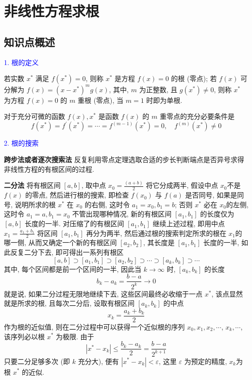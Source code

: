 \newpage

\section{非线性方程求根}
\subsection{知识点概述}

\textcolor{blue}{1. 根的定义}

若实数 $ x^{*} $ 满足 $ f\left(x^{*}\right)=0 $, 则称 $ x^{*} $ 是方程 $ f(x)=0 $ 的根 (零点); 若 $ f(x) $ 可分解为 $ f(x)=\left(x-x^{*}\right)^{m} g(x) $, 其中, $ m $ 为正整数, 且 $ g\left(x^{*}\right) \neq 0 $, 则称 $ x^{*} $ 为方程 $ f(x)=0 $ 的 $ m $ 重根 (零点), 当 $ m=1 $ 时即为单根.

对于充分可微的函数 $ f(x), x^{*} $ 是函数 $ f(x) $ 的 $ m $ 重零点的充分必要条件是
$$
f\left(x^{*}\right)=f^{\prime}\left(x^{*}\right)=\cdots=f^{(m-1)}\left(x^{*}\right)=0, \quad f^{(m)}\left(x^{*}\right) \neq 0
$$

\textcolor{blue}{2. 根的搜索}

\textbf{跨步法或者逐次搜索法} \; 反复利用零点定理选取合适的步长判断端点是否异号求得非线性方程的有根区间的过程.

\textbf{二分法} \; 将有根区间 $ [a, b] $, 取中点 $ x_{0}=\frac{(a+b)}{2} $ 将它分成两半, 假设中点 $ x_{0} $不是 $ f(x) $ 的零点, 然后进行根的搜索, 即检查 $ f\left(x_{0}\right) $ 与 $ f(a) $ 是否同号, 如果是同号, 说明所求的根 $ x^{*} $ 在 $ x_{0} $ 的右侧, 这时令 $ a_{1}=x_{0}, b_{1}=b $; 否则 $ x^{*} $ 必在 $ x_{0} $的左侧, 这时令 $ a_{1}=a, b_{1}=x_{0} $ 不管出现哪种情况, 新的有根区间 $ \left[a_{1}, b_{1}\right] $ 的长度仅为 $ [a, b] $ 长度的一半. 对压缩了的有根区间 $ \left[a_{1}, b_{1}\right] $ 继续上述过程, 即用中点 $ x_{1}=\frac{a_{1}+b_{1}}{2} $ 将区间 $ \left[a_{1}, b_{1}\right] $ 再分为两半, 然后通过根的搜索判定所求的根在 $ x_{1} $的哪一侧, 从而又确定一个新的有根区间 $ \left[a_{2}, b_{2}\right] $, 其长度是 $ \left[a_{1}, b_{1}\right] $ 长度的一半, 如此反复二分下去, 即可得出一系列有根区
$$
[a, b] \supset\left[a_{1}, b_{1}\right] \supset\left[a_{2}, b_{2}\right] \supset \cdots \supset\left[a_{k}, b_{k}\right] \supset \cdots
$$
其中, 每个区间都是前一个区间的一半, 因此当 $ k \rightarrow \infty $ 时, $ \left[a_{k}, b_{k}\right] $ 的长度
$$
b_{k}-a_{k}=\frac{b-a}{2^{k}} \rightarrow 0
$$
就是说, 如果二分过程无限地继续下去, 这些区间最终必收缩于一点 $ x^{*} $, 该点显然就是所求的根, 且每次二分后, 设取有根区间 $ \left[a_{k}, b_{k}\right] $ 的中点
$$
x_{k}=\frac{a_{k}+b_{k}}{2}
$$
作为根的近似值, 则在二分过程中可以获得一个近似根的序列 $ x_{0}, x_{1}, x_{2}, \cdots $, $ x_{k}, \cdots $, 该序列必以根 $ x^{*} $ 为极限. 由于
$$
\left|x^{*}-x_{k}\right| \leqslant \frac{b_{k}-a_{k}}{2}=\frac{b-a}{2^{k+1}}
$$
只要二分足够多次 (即 $ k $ 充分大), 便有 $ \left|x^{*}-x_{k}\right|<\varepsilon $, 这里 $ \varepsilon $ 为预定的精度, $ x_{k} $为根 $ x^{*} $ 的近似.


